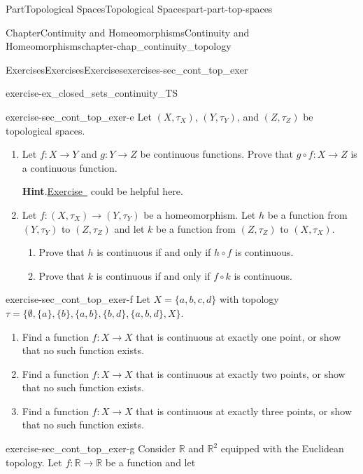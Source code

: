 \documentclass[oneside,10pt,]{book}
\newcommand{\blocktitlefont}{\relax}
\newcommand{\xreffont}{\relax}
\numberwithin{equation}{chapter}
\newcommand{\R}{\mathbb{R}}
\begin{document}
\begin{partptx}{Part}{Topological Spaces}{}{Topological Spaces}{}{}{part-part-top-spaces}
\begin{chapterptx}{Chapter}{Continuity and Homeomorphisms}{}{Continuity and Homeomorphisms}{}{}{chapter-chap_continuity_topology}
\begin{exercises-section}{Exercises}{Exercises}{}{Exercises}{}{}{exercises-sec_cont_top_exer}
\begin{divisionexercise}{4}{}{}{exercise-ex_closed_sets_continuity_TS}
\end{divisionexercise}%
\begin{divisionexercise}{5}{}{}{exercise-sec_cont_top_exer-e}%
Let \((X, \tau_X)\), \((Y, \tau_Y)\), and \((Z, \tau_Z)\) be topological spaces.%
\begin{enumerate}[font=\bfseries,label=(\alph*),ref=\alph*]%
\item{}Let \(f: X \to Y\) and \(g : Y \to Z\) be continuous functions. Prove that \(g \circ f : X \to Z\) is a continuous function.%
\par\smallskip%
\noindent\textbf{\blocktitlefont Hint}.\hypertarget{hint-sec_cont_top_exer-e-b-b}{}\quad{}\hyperlink{exercise-ex_inverse_composite_sets}{Exercise~{\xreffont 9}} could be helpful here.%
\item{}Let \(f: (X, \tau_X) \to (Y, \tau_Y)\) be a homeomorphism. Let \(h\) be a function from \((Y, \tau_Y)\) to \((Z, \tau_Z)\) and let \(k\) be a function from \((Z, \tau_Z)\) to \((X, \tau_X)\).%
\begin{enumerate}[font=\bfseries,label=(\roman*),ref=\theenumi.\roman*]%
\item{}Prove that \(h\) is continuous if and only if \(h \circ f\) is continuous.%
\item{}Prove that \(k\) is continuous if and only if \(f \circ k\) is continuous.%
\end{enumerate}%
\end{enumerate}%
\end{divisionexercise}%
\begin{divisionexercise}{6}{}{}{exercise-sec_cont_top_exer-f}%
Let \(X = \{a,b,c,d\}\) with topology \(\tau = \{\emptyset, \{a\}, \{b\}, \{a,b\}, \{b,d\}, \{a,b,d\}, X\}\).%
\begin{enumerate}[font=\bfseries,label=(\alph*),ref=\alph*]%
\item{}Find a function \(f: X \to X\) that is continuous at exactly one point, or show that no such function exists.%
\item{}Find a function \(f: X \to X\) that is continuous at exactly two points, or show that no such function exists.%
\item{}Find a function \(f: X \to X\) that is continuous at exactly three points, or show that no such function exists.%
\end{enumerate}%
\end{divisionexercise}%
\begin{divisionexercise}{7}{}{}{exercise-sec_cont_top_exer-g}%
Consider \(\R\) and \(\R^2\) equipped with the Euclidean topology. Let \(f : \R \to \R\) be a function and let%

\end{divisionexercise}
\end{exercises-section}
\end{chapterptx}
\end{partptx}
\end{document}
